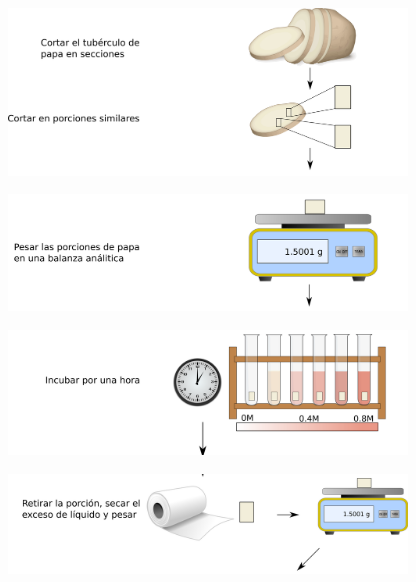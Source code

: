 \documentclass[12pt, aspectratio=169]{beamer}
\begin{document}
	\begin{frame}
	
		\begin{figure}
			\includegraphics[width=400px]{1.png}
			\centering
		\end{figure}
	
	\end{frame}

	\begin{frame}
		
		\begin{figure}
			\includegraphics[width=400px]{2_.png}
			\centering
		\end{figure}
		
	\end{frame}

	\begin{frame}
		
		\begin{figure}
			\includegraphics[width=400px]{3.png}
			\centering
		\end{figure}
		
	\end{frame}

	\begin{frame}
		
		\begin{figure}
			\includegraphics[width=400px]{4.png}
			\centering
		\end{figure}
		
	\end{frame}
\end{document}
